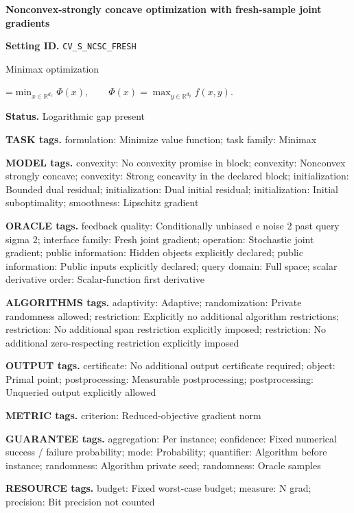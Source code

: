 \documentclass[10pt,a4paper]{article}
\newcommand{\AtlasMath}[1]{\par\begingroup\centering\setbox0=\hbox{$\displaystyle #1$}\ifdim\wd0>1.4\linewidth\typeout{ATLAS WIDE FORMULA: \the\wd0}\fi\ifdim\wd0>\linewidth\resizebox{\linewidth}{!}{\box0}\else\box0\fi\par\endgroup}
\begin{document}
\raggedright

{\LARGE\bfseries\sffamily\color{AtlasNavy} Nonconvex-strongly concave optimization with fresh-sample joint gradients\par}\vspace{5pt}
\textbf{Setting ID.} \texttt{CV\_\allowbreak{}S\_\allowbreak{}NCSC\_\allowbreak{}FRESH}

Minimax optimization


\AtlasMath{\min_{x\in\mathbb{R}^{d_x}}\Phi(x),\qquad\Phi(x)=\max_{y\in\mathbb{R}^{d_y}}f(x,y).}


\textbf{Status.} Logarithmic gap present

\textbf{TASK tags.} formulation: Minimize value function; task family: Minimax

\textbf{MODEL tags.} convexity: No convexity promise in block; convexity: Nonconvex strongly concave; convexity: Strong concavity in the declared block; initialization: Bounded dual residual; initialization: Dual initial residual; initialization: Initial suboptimality; smoothness: Lipschitz gradient

\textbf{ORACLE tags.} feedback quality: Conditionally unbiased e noise 2 past query sigma 2; interface family: Fresh joint gradient; operation: Stochastic joint gradient; public information: Hidden objects explicitly declared; public information: Public inputs explicitly declared; query domain: Full space; scalar derivative order: Scalar-function first derivative

\textbf{ALGORITHMS tags.} adaptivity: Adaptive; randomization: Private randomness allowed; restriction: Explicitly no additional algorithm restrictions; restriction: No additional span restriction explicitly imposed; restriction: No additional zero-respecting restriction explicitly imposed

\textbf{OUTPUT tags.} certificate: No additional output certificate required; object: Primal point; postprocessing: Measurable postprocessing; postprocessing: Unqueried output explicitly allowed

\textbf{METRIC tags.} criterion: Reduced-objective gradient norm

\textbf{GUARANTEE tags.} aggregation: Per instance; confidence: Fixed numerical success / failure probability; mode: Probability; quantifier: Algorithm before instance; randomness: Algorithm private seed; randomness: Oracle samples

\textbf{RESOURCE tags.} budget: Fixed worst-case budget; measure: N grad; precision: Bit precision not counted
\end{document}
